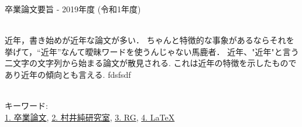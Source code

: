 卒業論文要旨 - 2019年度 (令和1年度)
\begin{center}
\begin{large}
\end{large}
\end{center}

~ \\

近年，書き始めが近年な論文が多い．
ちゃんと特徴的な事象があるならそれを挙げて，``近年''なんて曖昧ワードを使うんじゃない馬鹿者．
近年、"近年"と言う二文字の文字列から始まる論文が散見される. これは近年の特徴を示したものであり近年の傾向とも言える.
fdsfsdf

~ \\
キーワード:\\
\underline{1. 卒業論文},
\underline{2. 村井純研究室},
\underline{3. RG},
\underline{4. LaTeX}
\begin{flushright}
\dept \\
\author
\end{flushright}

